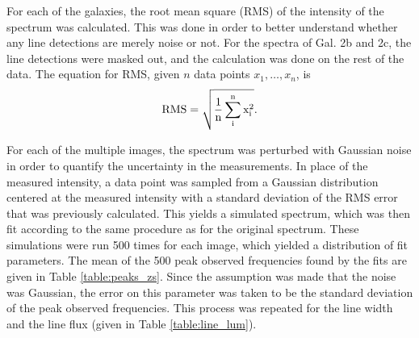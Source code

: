 \documentclass[11pt]{article}
\begin{document}
For each of the galaxies, the root mean square (RMS) of the intensity of the spectrum was calculated. This was done in order to better understand whether any line detections are merely noise or not. For the spectra of Gal. 2b and 2c, the line detections were masked out, and the calculation was done on the rest of the data. The equation for RMS, given $n$ data points $x_1, \ldots, x_n$, is 
\begin{align}\label{eqn:rms}
	\rm{RMS} = \sqrt{\frac{1}{n}\sum_i^nx_i^2}.
\end{align}

For each of the multiple images, the spectrum was perturbed with Gaussian noise in order to quantify the uncertainty in the measurements. In place of the measured intensity, a data point was sampled from a Gaussian distribution centered at the measured intensity with a standard deviation of the RMS error that was previously calculated. This yields a simulated spectrum, which was then fit according to the same procedure as for the original spectrum. These simulations were run 500 times for each image, which yielded a distribution of fit parameters. The mean of the 500 peak observed frequencies found by the fits are given in Table \ref{table:peaks_zs}. Since the assumption was made that the noise was Gaussian, the error on this parameter was taken to be the standard deviation of the peak observed frequencies. This process was repeated for the line width and the line flux (given in Table \ref{table:line_lum}).
\end{document}
